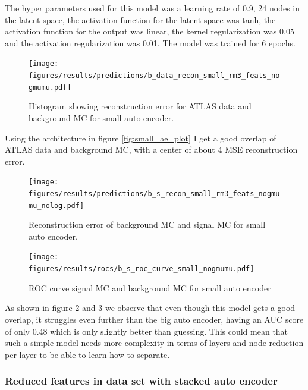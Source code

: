 \documentclass[ reprint, amsmath,amssymb, aps, nofootinbib]{revtex4-2}
\begin{document}
The hyper parameters used for this model was a learning rate of 0.9, 24 nodes in the latent space, the activation function for the latent space was tanh, the activation function for the output was linear, the kernel regularization was 0.05 and the activation regularization was 0.01. The model was trained for 6 epochs. 


\begin{figure}[H]
     \centering
         \texttt{[image: figures/results/predictions/b\_data\_recon\_small\_rm3\_feats\_nogmumu.pdf]}
         \caption{Histogram showing reconstruction error for ATLAS data and background MC for small auto encoder. }
     \label{fig:data_b_small_pred}
\end{figure}

Using the architecture in figure \ref{fig:small_ae_plot} I get a good overlap of ATLAS data and background MC, with a center of about 4 MSE reconstruction error. 

\begin{figure}[H]    
 \centering
    \texttt{[image: figures/results/predictions/b\_s\_recon\_small\_rm3\_feats\_nogmumu\_nolog.pdf]}
    \caption{Reconstruction error of background MC and signal MC for small auto encoder. }
    \label{fig:s_b_small_pred_}   
  
\end{figure}

\begin{figure}[H]    
  \centering
         \texttt{[image: figures/results/rocs/b\_s\_roc\_curve\_small\_nogmumu.pdf]}
         \caption{ROC curve signal MC and background MC for small auto encoder}
         \label{fig:s_b_small_roc}  
  
\end{figure}


As shown in figure \ref{fig:s_b_small_pred_} and \ref{fig:s_b_small_roc} we observe that even though this model gets a good overlap, it struggles even further than the big auto encoder, having an AUC score of only 0.48 which is only slightly better than guessing. This could mean that such a simple model needs more complexity in terms of layers and node reduction per layer to be able to learn how to separate. \par 

\subsubsection{Reduced features in data set with stacked auto encoder}
\end{document}
